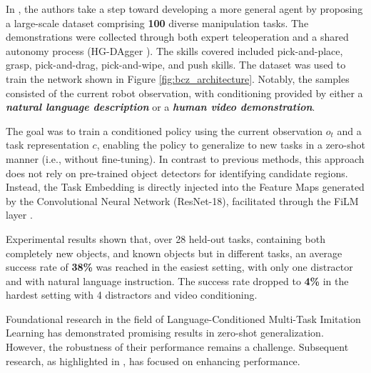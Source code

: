 In \cite{jang2022bc_z}, the authors take a step toward developing a more general agent by proposing a large-scale dataset comprising \textbf{100} diverse manipulation tasks. The demonstrations were collected through both expert teleoperation and a shared autonomy process (HG-DAgger \cite{kelly2019hg_dagger}). The skills covered included pick-and-place, grasp, pick-and-drag, pick-and-wipe, and push skills. The dataset was used to train the network shown in Figure \ref{fig:bcz_architecture}. Notably, the samples consisted of the current robot observation, with conditioning provided by either a \textit{\textbf{natural language description}} or a \textit{\textbf{human video demonstration}}.

The goal was to train a conditioned policy using the current observation $o_{t}$ and a task representation $c$, enabling the policy to generalize to new tasks in a zero-shot manner (i.e., without fine-tuning). In contrast to previous methods, this approach does not rely on pre-trained object detectors for identifying candidate regions. Instead, the Task Embedding is directly injected into the Feature Maps generated by the Convolutional Neural Network (ResNet-18), facilitated through the FiLM layer \cite{perez2018film}.

Experimental results shown that, over 28 held-out tasks, containing both completely new objects, and known objects but in different tasks, an average success rate of \textbf{38\%} was reached in the easiest setting, with only one distractor and with natural language instruction. The success rate dropped to \textbf{4\%} in the hardest setting with 4 distractors and video conditioning.


Foundational research in the field of Language-Conditioned Multi-Task Imitation Learning has demonstrated promising results in zero-shot generalization. However, the robustness of their performance remains a challenge. Subsequent research, as highlighted in \cite{brohan2022rt,mees2022calvin,mees2022hulc}, has focused on enhancing performance. 

